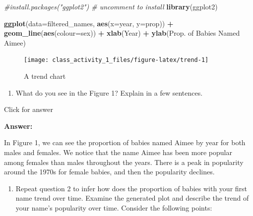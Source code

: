 \documentclass[
]{book}
\newenvironment{Shaded}{\begin{snugshade}}{\end{snugshade}}
\newcommand{\AttributeTok}[1]{\textcolor[rgb]{0.13,0.29,0.53}{#1}}
\newcommand{\CommentTok}[1]{\textcolor[rgb]{0.56,0.35,0.01}{\textit{#1}}}
\newcommand{\FunctionTok}[1]{\textcolor[rgb]{0.13,0.29,0.53}{\textbf{#1}}}
\newcommand{\NormalTok}[1]{#1}
\newcommand{\SpecialCharTok}[1]{\textcolor[rgb]{0.81,0.36,0.00}{\textbf{#1}}}
\newcommand{\StringTok}[1]{\textcolor[rgb]{0.31,0.60,0.02}{#1}}
\providecommand{\tightlist}{%
  \setlength{\itemsep}{0pt}\setlength{\parskip}{0pt}}
\begin{document}
\begin{Shaded}
\begin{Highlighting}[]
\CommentTok{\#install.packages("ggplot2")   \# uncomment to install}
\FunctionTok{library}\NormalTok{(ggplot2)}
\end{Highlighting}
\end{Shaded}

\begin{Shaded}
\begin{Highlighting}[]
\FunctionTok{ggplot}\NormalTok{(}\AttributeTok{data=}\NormalTok{filtered\_names, }\FunctionTok{aes}\NormalTok{(}\AttributeTok{x=}\NormalTok{year, }\AttributeTok{y=}\NormalTok{prop)) }\SpecialCharTok{+} 
  \FunctionTok{geom\_line}\NormalTok{(}\FunctionTok{aes}\NormalTok{(}\AttributeTok{colour=}\NormalTok{sex)) }\SpecialCharTok{+} 
  \FunctionTok{xlab}\NormalTok{(}\StringTok{\textquotesingle{}Year\textquotesingle{}}\NormalTok{) }\SpecialCharTok{+} 
  \FunctionTok{ylab}\NormalTok{(}\StringTok{\textquotesingle{}Prop. of Babies Named Aimee\textquotesingle{}}\NormalTok{)}
\end{Highlighting}
\end{Shaded}

\begin{figure}
\texttt{[image: class\_activity\_1\_files/figure-latex/trend-1]} \caption{A trend chart}\label{fig:trend}
\end{figure}

\begin{enumerate}
\def\labelenumi{\arabic{enumi}.}
\setcounter{enumi}{1}
\tightlist
\item
  What do you see in the Figure 1? Explain in a few sentences.
\end{enumerate}

Click for answer

\textbf{Answer:}

In Figure 1, we can see the proportion of babies named Aimee by year for both males and females. We notice that the name Aimee has been more popular among females than males throughout the years. There is a peak in popularity around the 1970s for female babies, and then the popularity declines.

\begin{enumerate}
\def\labelenumi{\arabic{enumi}.}
\setcounter{enumi}{2}
\tightlist
\item
  Repeat question 2 to infer how does the proportion of babies with your first name trend over time. Examine the generated plot and describe the trend of your name's popularity over time. Consider the following points:
\end{enumerate}
\end{document}
